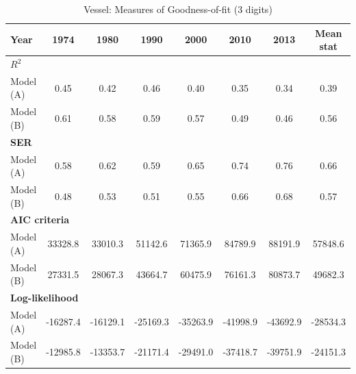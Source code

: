 \documentclass[a4paper,11pt]{article}
\begin{document}
\begin{table}[htbp]
  \centering
  \caption{Vessel: Measures of Goodness-of-fit (3 digits)}
    \footnotesize{
\begin{center}
\begin{tabular}{l|cccccc|c}
\hline \hline
Year  & \multicolumn{1}{c}{1974} & \multicolumn{1}{c}{1980} & \multicolumn{1}{c}{1990} & \multicolumn{1}{c}{2000} & 2010  & \multicolumn{1}{c}{2013} & Mean stat \\ \hline
\multicolumn{8}{l}{\textbf{$R^2$} }\\ \hline
Model (A)& \multicolumn{1}{c}{0.45} & \multicolumn{1}{c}{0.42} & \multicolumn{1}{c}{0.46} & \multicolumn{1}{c}{0.40} & 0.35 & \multicolumn{1}{c}{0.34} & 0.39 \\
  Model (B) & \multicolumn{1}{c}{0.61} & \multicolumn{1}{c}{0.58} & \multicolumn{1}{c}{0.59} & \multicolumn{1}{c}{0.57} & 0.49 & \multicolumn{1}{c}{0.46} & 0.56 \\ \hline
\multicolumn{8}{l}{\textbf{SER}  }  \\ \hline
    Model (A) & \multicolumn{1}{c}{0.58} & \multicolumn{1}{c}{0.62} & \multicolumn{1}{c}{0.59} & \multicolumn{1}{c}{0.65} & 0.74  & \multicolumn{1}{c}{0.76} & 0.66 \\
    Model (B) & \multicolumn{1}{c}{0.48} & \multicolumn{1}{c}{0.53} & \multicolumn{1}{c}{0.51} & \multicolumn{1}{c}{0.55} & 0.66  & \multicolumn{1}{c}{0.68} & 0.57 \\ \hline
   \multicolumn{8}{l}{\textbf{AIC criteria}}  \\ \hline
   Model (A) & \multicolumn{1}{c}{33328.8} & \multicolumn{1}{c}{33010.3} & \multicolumn{1}{c}{51142.6} & \multicolumn{1}{c}{71365.9} & 84789.9 & \multicolumn{1}{c}{88191.9} & 57848.6 \\
   Model (B) & \multicolumn{1}{c}{27331.5} & \multicolumn{1}{c}{28067.3} & \multicolumn{1}{c}{43664.7} & \multicolumn{1}{c}{60475.9} & 76161.3 & \multicolumn{1}{c}{80873.7} & 49682.3 \\ \hline
    \multicolumn{8}{l}{\textbf{Log-likelihood}} \\ \hline
    Model (A) & \multicolumn{1}{c}{-16287.4} & \multicolumn{1}{c}{-16129.1} & \multicolumn{1}{c}{-25169.3} & \multicolumn{1}{c}{-35263.9} & -41998.9 & \multicolumn{1}{c}{-43692.9} & -28534.3 \\
    Model (B) & \multicolumn{1}{c}{-12985.8} & \multicolumn{1}{c}{-13353.7} & \multicolumn{1}{c}{-21171.4} & \multicolumn{1}{c}{-29491.0} & -37418.7 & \multicolumn{1}{c}{-39751.9} & -24151.3 \\

\end{tabular}
\end{center}}
\end{table}
\end{document}
